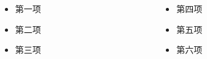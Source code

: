 \documentclass{ctexbeamer}
\begin{document}
    \begin{frame}
        \begin{columns}[c]
            \begin{column}{.5\textwidth}
                \begin{itemize}
                    \item 第一项
                    \item 第二项
                    \item 第三项
                \end{itemize}
            \end{column}
            \begin{column}{.5\textwidth}
                \begin{itemize}
                    \item 第四项
                    \item 第五项
                    \item 第六项
                \end{itemize}
            \end{column}
        \end{columns}
    \end{frame}
\end{document}
